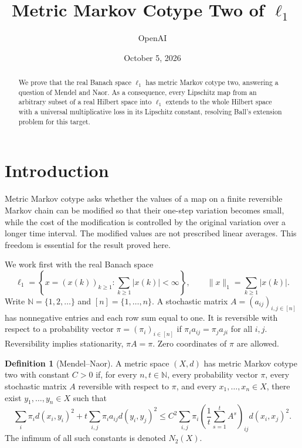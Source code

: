 \documentclass[11pt]{article}
\title{Metric Markov Cotype Two of $\ell_1$}
\author{OpenAI}
\date{October 5, 2026}
\theoremstyle{definition}
\newtheorem{definition}[theorem]{Definition}
\theoremstyle{remark}
\numberwithin{equation}{section}
\newcommand{\N}{\mathbb N}
\begin{document}
\maketitle

\begin{abstract}
We prove that the real Banach space $\ell_1$ has metric Markov cotype two,
answering a question of Mendel and Naor. As a consequence, every Lipschitz
map from an arbitrary subset of a real Hilbert space into $\ell_1$ extends
to the whole Hilbert space with a universal multiplicative loss in its
Lipschitz constant, resolving Ball's extension problem for this target.
\end{abstract}

\section{Introduction}
\label{sec:intro}

Metric Markov cotype asks whether the values of a map on a finite
reversible Markov chain can be modified so that their one-step
variation becomes small, while the cost of the modification is
controlled by the original variation over a longer time interval.
The modified values are not prescribed linear averages. This freedom
is essential for the result proved here.

We work first with the real Banach space
\[
 \ell_1=\left\{x=(x(k))_{k\geq1}:\sum_{k\geq1}|x(k)|<\infty\right\},
 \qquad \|x\|_1=\sum_{k\geq1}|x(k)|.
\]
Write $\N=\{1,2,\ldots\}$ and $[n]=\{1,\ldots,n\}$. A stochastic matrix
$A=(a_{ij})_{i,j\in[n]}$ has nonnegative entries and each row sum
equal to one. It is reversible with respect to a probability vector
$\pi=(\pi_i)_{i\in[n]}$ if $\pi_i a_{ij}=\pi_j a_{ji}$ for all
$i,j$. Reversibility implies stationarity, $\pi A=\pi$.
Zero coordinates of $\pi$ are allowed.

\begin{definition}[Mendel--Naor]\label{def:cotype}
A metric space $(X,d)$ has metric Markov cotype two with constant $C>0$
if, for every $n,t\in\N$, every probability vector $\pi$, every
stochastic matrix $A$ reversible with respect to $\pi$, and every
$x_1,\ldots,x_n\in X$, there exist $y_1,\ldots,y_n\in X$ such that
\begin{equation}\label{eq:cotype}
 \sum_i\pi_i d(x_i,y_i)^2
 +t\sum_{i,j}\pi_i a_{ij}d(y_i,y_j)^2
 \leq C^2\sum_{i,j}\pi_i
 \left(\frac1t\sum_{s=1}^t A^s\right)_{ij}d(x_i,x_j)^2.
\end{equation}
The infimum of all such constants is denoted $N_2(X)$.
\end{definition}
\end{document}
